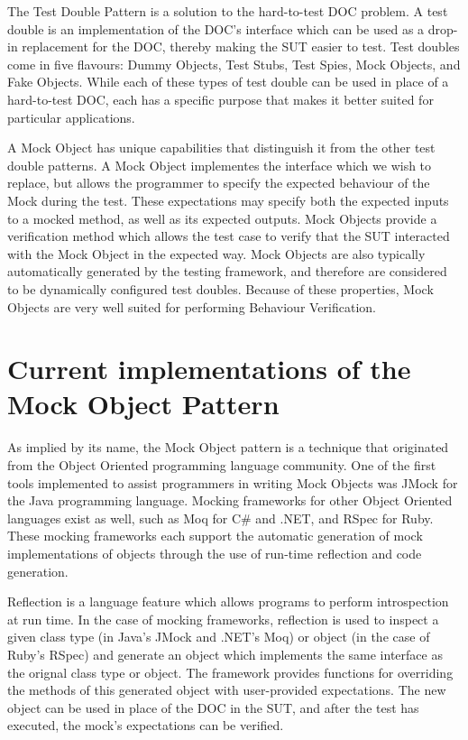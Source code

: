 The Test Double Pattern is a solution to the hard-to-test DOC
problem. A test double is an implementation of the DOC's interface
which can be used as a drop-in replacement for the DOC, thereby making
the SUT easier to test. Test doubles come in five flavours: Dummy
Objects, Test Stubs, Test Spies, Mock Objects, and Fake Objects. While
each of these types of test double can be used in place of a
hard-to-test DOC, each has a specific purpose that makes it better
suited for particular applications.

A Mock Object has unique capabilities that distinguish it from the
other test double patterns. A Mock Object implementes the interface
which we wish to replace, but allows the programmer to specify the
expected behaviour of the Mock during the test. These expectations may
specify both the expected inputs to a mocked method, as well as its
expected outputs. Mock Objects provide a verification method which
allows the test case to verify that the SUT interacted with the Mock
Object in the expected way. Mock Objects are also typically
automatically generated by the testing framework, and therefore are
considered to be dynamically configured test doubles. Because of these
properties, Mock Objects are very well suited for performing Behaviour
Verification.

\section{Current implementations of the Mock Object Pattern}

As implied by its name, the Mock Object pattern is a technique that
originated from the Object Oriented programming language
community. One of the first tools implemented to assist programmers in
writing Mock Objects was JMock \cite{www:jmock} for the Java
programming language. Mocking frameworks for other Object Oriented
languages exist as well, such as Moq \cite{www:moq} for C# and .NET,
and RSpec \cite{www:rspec} for Ruby. These mocking frameworks each
support the automatic generation of mock implementations of objects
through the use of run-time reflection and code generation.


Reflection is a language feature which allows programs to perform
introspection at run time. In the case of mocking frameworks,
reflection is used to inspect a given class type (in Java's JMock and
.NET's Moq) or object (in the case of Ruby's RSpec) and generate an
object which implements the same interface as the orignal class type
or object. The framework provides functions for overriding the methods
of this generated object with user-provided expectations. The new
object can be used in place of the DOC in the SUT, and after the test
has executed, the mock's expectations can be verified.

